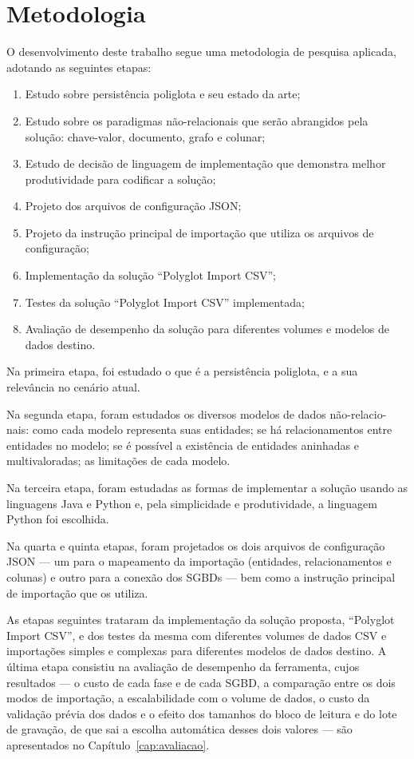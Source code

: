 \section{Metodologia}

O desenvolvimento deste trabalho segue uma metodologia de pesquisa aplicada, adotando as
seguintes etapas:

\begin{enumerate}
  \item Estudo sobre persistência poliglota e seu estado da arte;
  \item Estudo sobre os paradigmas não-relacionais que serão abrangidos pela solução:
        chave-valor, documento, grafo e colunar;
  \item Estudo de decisão de linguagem de implementação que demonstra melhor produtividade
        para codificar a solução;
  \item Projeto dos arquivos de configuração JSON;
  \item Projeto da instrução principal de importação que utiliza os arquivos de
        configuração;
  \item Implementação da solução ``Polyglot Import CSV'';
  \item Testes da solução ``Polyglot Import CSV'' implementada;
  \item Avaliação de desempenho da solução para diferentes volumes e modelos de dados
        destino.
\end{enumerate}

Na primeira etapa, foi estudado o que é a persistência poliglota, e a sua relevância no
cenário atual.

Na segunda etapa, foram estudados os diversos modelos de dados não-relacio-
nais: como cada
modelo representa suas entidades; se há relacionamentos entre entidades no modelo; se é
possível a existência de entidades aninhadas e multivaloradas; as limitações de cada
modelo.

Na terceira etapa, foram estudadas as formas de implementar a solução usando as linguagens
Java e Python e, pela simplicidade e produtividade, a linguagem Python foi escolhida.

Na quarta e quinta etapas, foram projetados os dois arquivos de configuração JSON --- um
para o mapeamento da importação (entidades, relacionamentos e colunas) e outro para a
conexão dos SGBDs --- bem como a instrução principal de importação que os utiliza.

As etapas seguintes trataram da implementação da solução proposta, ``Polyglot Import
CSV'', e dos testes da mesma com diferentes volumes de dados CSV e importações simples e
complexas para diferentes modelos de dados destino. A última etapa consistiu na avaliação
de desempenho da ferramenta, cujos resultados --- o custo de cada fase e de cada SGBD, a
comparação entre os dois modos de importação, a escalabilidade com o volume de dados, o
custo da validação prévia dos dados e o efeito dos tamanhos do bloco de leitura e do lote
de gravação, de que sai a escolha automática desses dois valores --- são apresentados no Capítulo~\ref{cap:avaliacao}.

